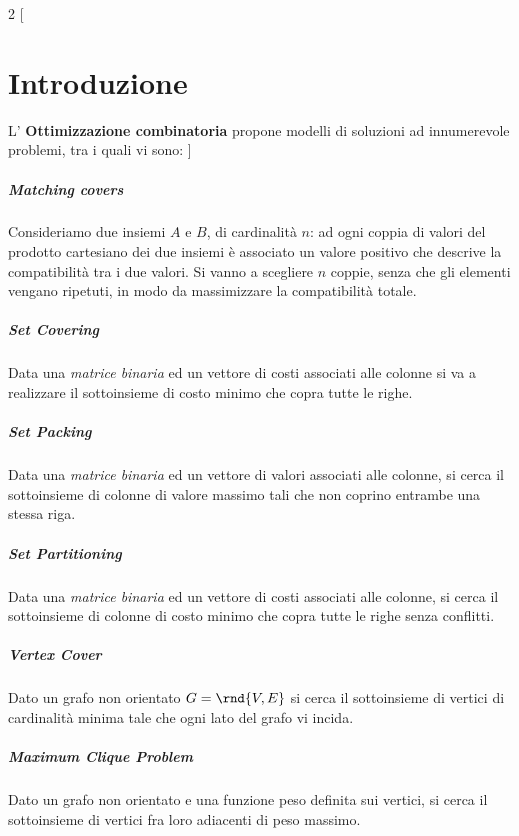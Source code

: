 \documentclass[\main/main.tex]{subfiles}
\begin{document}
\begin{multicols}{2}
  [
    \chapter{Introduzione}
    L' \textbf{Ottimizzazione combinatoria} propone modelli di soluzioni ad innumerevole problemi, tra i quali vi sono:
  ]
  \paragraph*{Matching covers}
  Consideriamo due insiemi \(A\) e \(B\), di cardinalità \(n\): ad ogni coppia di valori del prodotto cartesiano dei due insiemi è associato un valore positivo che descrive la compatibilità tra i due valori. Si vanno a scegliere \(n\) coppie, senza che gli elementi vengano ripetuti, in modo da massimizzare la compatibilità totale.

  \paragraph*{Set Covering}
  Data una \textit{matrice binaria} ed un vettore di costi associati alle colonne si va a realizzare il sottoinsieme di costo minimo che copra tutte le righe.

  \paragraph*{Set Packing}
  Data una \textit{matrice binaria} ed un vettore di valori associati alle colonne, si cerca il sottoinsieme di colonne di valore massimo tali che non coprino entrambe una stessa riga.

  \paragraph*{Set Partitioning}
  Data una \textit{matrice binaria} ed un vettore di costi associati alle colonne, si cerca il sottoinsieme di colonne di costo minimo che copra tutte le righe senza conflitti.

  \paragraph*{Vertex Cover}
  Dato un grafo non orientato \(G=\rnd{V, E}\) si cerca il sottoinsieme di vertici di cardinalità minima tale che ogni lato del grafo vi incida.

  \paragraph*{Maximum Clique Problem}
  Dato un grafo non orientato e una funzione peso definita sui vertici, si cerca il sottoinsieme di vertici fra loro adiacenti di peso massimo.


\end{multicols}
\end{document}
